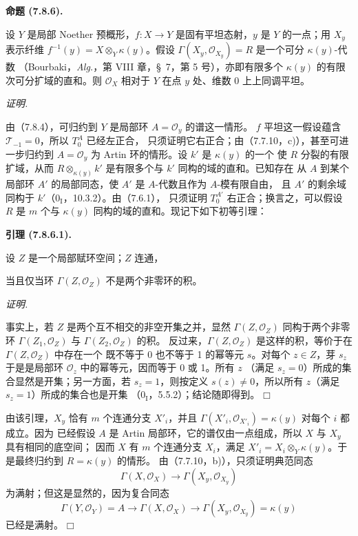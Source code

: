 \documentclass[UTF8,fontset=none,11pt,oneside,openany]{ctexbook}
\providecommand{\square}{\mdlgwhtsquare}
\newenvironment{lemma}[1][]{%
  \par\medskip\noindent\textbf{引理 (#1).}\ %
}{\par}
\newenvironment{proposition}[1][]{%
  \par\medskip\noindent\textbf{命题 (#1).}\ %
}{\par}
\newenvironment{proof}{%
  \par\smallskip\noindent\textit{证明.}\ %
}{\hfill$\square$\par}
\newcommand{\oldpage}[2][]{%
  \hypertarget{ega-source-page-#1-#2}{}%
  \marginnote{\scriptsize\textbf{#1}~|~#2}\ignorespaces}
\begin{document}
\begin{proposition}[7.8.6]
设 $Y$ 是局部 Noether 预概形，$f:X\to Y$ 是固有平坦态射，$y$ 是
$Y$ 的一点；用 $X_y$ 表示纤维
$f^{-1}(y)=X\otimes_Y\kappa(y)$。假设
$\Gamma(X_y,\mathscr O_{X_y})=R$ 是一个可分 $\kappa(y)$-代数
（Bourbaki，\emph{Alg.}，第 VIII 章，\S~7，第 5 号），亦即有限多个
$\kappa(y)$ 的有限次可分扩域的直和。则 $\mathscr O_X$ 相对于 $Y$
在点 $y$ 处、维数 0 上上同调平坦。
\end{proposition}

\begin{proof}
由（7.8.4），可归约到 $Y$ 是局部环 $A=\mathscr O_y$ 的谱这一情形。
$f$ 平坦这一假设蕴含 $\mathscr T_{-1}=0$，所以 $T_0^A$ 已经左正合，
只须证明它右正合；由（7.7.10，c)），甚至可进一步归约到
$A=\mathscr O_y$ 为 Artin 环的情形。设 $k'$ 是 $\kappa(y)$ 的一个
使 $R$ 分裂的有限扩域，从而
$R\otimes_{\kappa(y)}k'$ 是有限多个与 $k'$ 同构的域的直和。已知存在
从 $A$ 到某个局部环 $A'$ 的局部同态，使 $A'$ 是 $A$-代数且作为
$A$-模有限自由，
且 $A'$ 的剩余域同构于 $k'$（$0_{\mathrm I}$，10.3.2）。由（7.6.1），
只须证明 $T_0^{A'}$ 右正合；换言之，可以假设 $R$ 是 $m$ 个与
$\kappa(y)$ 同构的域的直和。现记下如下初等引理：

\begin{lemma}[7.8.6.1]
设 $Z$ 是一个局部赋环空间；$Z$ 连通，

\oldpage[III]{207}
当且仅当环 $\Gamma(Z,\mathscr O_Z)$ 不是两个非零环的积。
\end{lemma}

\begin{proof}
事实上，若 $Z$ 是两个互不相交的非空开集之并，显然
$\Gamma(Z,\mathscr O_Z)$ 同构于两个非零环
$\Gamma(Z_1,\mathscr O_Z)$ 与 $\Gamma(Z_2,\mathscr O_Z)$ 的积。
反过来，$\Gamma(Z,\mathscr O_Z)$ 是这样的积，等价于在
$\Gamma(Z,\mathscr O_Z)$ 中存在一个
既不等于 0 也不等于 1 的幂等元 $s$。对每个 $z\in Z$，芽 $s_z$
于是是局部环 $\mathscr O_z$ 中的幂等元，因而等于 0 或 1。所有 $z$
（满足 $s_z=0$）所成的集合显然是开集；另一方面，若 $s_z=1$，则按定义
$s(z)\ne0$，所以所有 $z$（满足 $s_z=1$）所成的集合也是开集
（$0_{\mathrm I}$，5.5.2）；结论随即得到。
\end{proof}

由该引理，$X_y$ 恰有 $m$ 个连通分支 $X'_i$，并且
$\Gamma(X'_i,\mathscr O_{X'_i})=\kappa(y)$ 对每个 $i$ 都成立。因为
已经假设 $A$ 是 Artin
局部环，它的谱仅由一点组成，所以 $X$ 与 $X_y$ 具有相同的底空间；
因而 $X$ 有 $m$ 个连通分支 $X_i$，满足
$X'_i=X_i\otimes_Y\kappa(y)$。于是最终归约到 $R=\kappa(y)$ 的情形。
由（7.7.10，b)），只须证明典范同态
\[
  \Gamma(X,\mathscr O_X)
  \longrightarrow
  \Gamma(X_y,\mathscr O_{X_y})
\]
为满射；但这是显然的，因为复合同态
\[
  \Gamma(Y,\mathscr O_Y)=A
  \longrightarrow
  \Gamma(X,\mathscr O_X)
  \longrightarrow
  \Gamma(X_y,\mathscr O_{X_y})=\kappa(y)
\]
已经是满射。
\end{proof}
\end{document}
